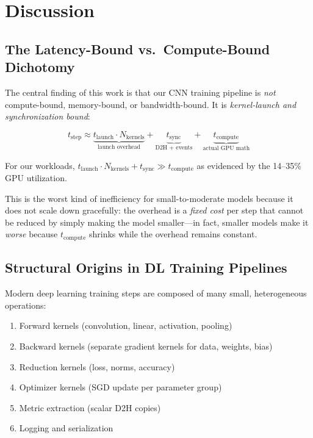\documentclass[10pt,twocolumn,letterpaper]{article}
\begin{document}
\section{Discussion}
\label{sec:discussion}

\subsection{The Latency-Bound vs.\ Compute-Bound Dichotomy}

The central finding of this work is that our CNN training pipeline is \emph{not} compute-bound, memory-bound, or bandwidth-bound.
It is \emph{kernel-launch and synchronization bound}:

\begin{equation}
t_{\text{step}} \approx \underbrace{t_{\text{launch}} \cdot N_{\text{kernels}}}_{\text{launch overhead}} + \underbrace{t_{\text{sync}}}_{\text{D2H + events}} + \underbrace{t_{\text{compute}}}_{\text{actual GPU math}}
\end{equation}

For our workloads, $t_{\text{launch}} \cdot N_{\text{kernels}} + t_{\text{sync}} \gg t_{\text{compute}}$ as evidenced by the 14--35\% GPU utilization.

This is the worst kind of inefficiency for small-to-moderate models because it does not scale down gracefully: the overhead is a \emph{fixed cost} per step that cannot be reduced by simply making the model smaller---in fact, smaller models make it \emph{worse} because $t_{\text{compute}}$ shrinks while the overhead remains constant.

\subsection{Structural Origins in DL Training Pipelines}

Modern deep learning training steps are composed of many small, heterogeneous operations:
\begin{enumerate}[nosep,leftmargin=*]
  \item Forward kernels (convolution, linear, activation, pooling)
  \item Backward kernels (separate gradient kernels for data, weights, bias)
  \item Reduction kernels (loss, norms, accuracy)
  \item Optimizer kernels (SGD update per parameter group)
  \item Metric extraction (scalar D2H copies)
  \item Logging and serialization
\end{enumerate}
\end{document}
